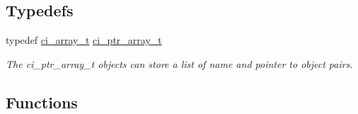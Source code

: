 \subsection*{Typedefs}
\begin{DoxyCompactItemize}
\item 
typedef \hyperlink{group__SIMPLE__ARRAYS_ga1bec5de79ca98bb53c039a8f8e959137}{ci\_\-array\_\-t} \hyperlink{group__PTR__ARRAYS_gacc2dabd40cf8cfb19cbcd73156a4cf3c}{ci\_\-ptr\_\-array\_\-t}
\begin{DoxyCompactList}\small\item\em The ci\_\-ptr\_\-array\_\-t objects can store a list of name and pointer to object pairs. \item\end{DoxyCompactList}\end{DoxyCompactItemize}
\subsection*{Functions}
